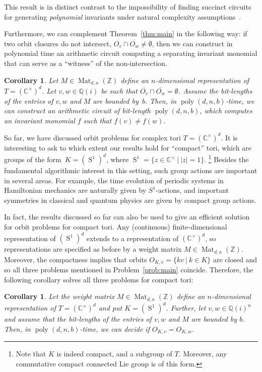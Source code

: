 \documentclass[10pt,a4paper]{article}
\DeclareMathOperator{\poly}{poly}
\DeclareMathOperator{\Ss}{S}
\DeclareMathOperator{\Mat}{Mat}
\newtheorem{corollary}[theorem]{Corollary}
\theoremstyle{definition}
\numberwithin{equation}{section}
\newcommand{\QQ}{\mathbb{Q}}
\newcommand{\CC}{\mathbb{C}}
\newcommand{\ZZ}{\mathbb{Z}}
\begin{document}
This result is in distinct contrast to the impossibility of finding succinct circuits for generating \emph{polynomial} invariants under natural complexity assumptions~\cite{GIMOWW}.

Furthermore, we can complement Theorem~\ref{thm:main} in the following way:
if two orbit closures do not intersect, $\overline{O_v} \cap \overline{O_w} \ne \emptyset$,
then we can construct in polynomial time an arithmetic circuit computing a separating invariant monomial that can serve as a ``witness'' of the non-intersection.

\begin{corollary}\label{cor:sep-invar}
Let $M \in\Mat_{d,n}(\ZZ)$ define an $n$-dimensional representation of $T = (\CC^\times)^d$.
%
%
Let $v,w \in \QQ(i)$ be such that $\overline{O_v} \cap \overline{O_w} = \emptyset$.
Assume the bit-lengths of the entries of $v,w$ and $M$ are bounded by~$b$.
Then, in $\poly(d,n,b)$-time, we can construct an arithmetic circuit of bit-length $\poly(d,n,b)$,
which computes an invariant monomial $f$ such that $f(v) \neq f(w)$.
\end{corollary}

%
%
%
So far, we have discussed orbit problems for complex tori $T = (\CC^\times)^d$.
It is interesting to ask to which extent our results hold for ``compact'' tori, which are groups of the form~$K = (\Ss^1)^d$, where $\Ss^1 = \{z \in \CC^\times \ | \ |z| = 1\}$.
\footnote{Note that $K$ is indeed compact, and a subgroup of $T$. Moreover, any commutative compact connected Lie group is of this form.}
Besides the fundamental algorithmic interest in this setting, such group actions are important in several areas.
For example, the time evolution of periodic systems in Hamiltonian mechanics are naturally given by $S^1$-actions, and important symmetries in classical and quantum physics are given by compact group actions.

In fact, the results discussed so far can also be used to give an efficient solution for orbit problems for compact tori.
Any (continuous) finite-dimensional representation of $(\Ss^1)^d$ extends to a representation of $(\CC^\times)^d$, so representations are specified as before by a weight matrix $M \in\Mat_{d,n}(\ZZ)$.
Moreover, the compactness implies that orbits $O_{K,v} = \{kv \ |\ k \in K\}$ are closed and so all three problems mentioned in Problem~\ref{prob:main} coincide.
Therefore, the following corollary solves all three problems for compact tori:

\begin{corollary}\label{cor:main}
Let the weight matrix $M \in\Mat_{d,n}(\ZZ)$ define an $n$-dimensional representation of  $T=(\CC^\times)^d$ and put $K = (\Ss^1)^d$.
Further, let $v,w \in \QQ(i)^n$ and assume that the bit-lengths of the entries of $v,w$ and $M$ are bounded by $b$.
Then, in $\poly(d,n,b)$-time, we can decide if $O_{K,v} = O_{K,w}$.
\end{corollary}
\end{document}
